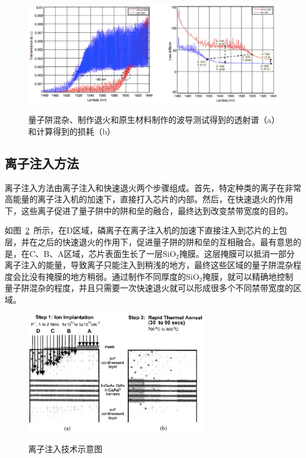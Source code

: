 \documentclass{ZJUthesis}
\begin{document}
\begin{figure}[htbp]
  \centering
  \includegraphics[width=1.0\textwidth]{./Pictures/sputter2.eps}\\
  \caption{量子阱混杂、制作退火和原生材料制作的波导测试得到的透射谱（a）和计算得到的损耗（b）}
  \label{fig_sputter2}
\end{figure}

\subsection{离子注入方法}

离子注入方法由离子注入和快速退火两个步骤组成。首先，特定种类的离子在非常高能量的离子注入机的加速下，直接打入芯片的内部。然后，在快速退火的作用下，这些离子促进了量子阱中的阱和垒的融合，最终达到改变禁带宽度的目的。

如图~\ref{fig_implantation}~所示，在D区域，磷离子在离子注入机的加速下直接注入到芯片的上包层，并在之后的快速退火的作用下，促进量子阱的阱和垒的互相融合。最有意思的是，在C、B、A区域，芯片表面生长了一层SiO$_2$掩膜。这层掩膜可以抵消一部分离子注入的能量，导致离子只能注入到稍浅的地方，最终这些区域的量子阱混杂程度会比没有掩膜的地方稍弱。通过制作不同厚度的SiO$_2$掩膜，就可以精确地控制量子阱混杂的程度，并且只需要一次快速退火就可以形成很多个不同禁带宽度的区域。

\begin{figure}[htbp]
  \centering
  \includegraphics[width=0.7\textwidth]{./Pictures/implantation.eps}\\
  \caption{离子注入技术示意图}
  \label{fig_implantation}
\end{figure}
\end{document}
